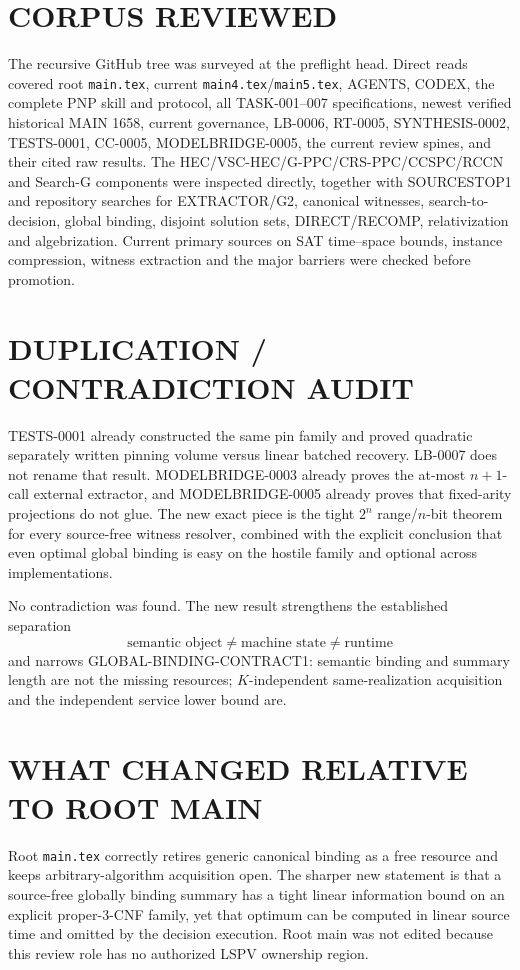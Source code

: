 \documentclass[11pt]{article}
\begin{document}
\section{CORPUS REVIEWED}
The recursive GitHub tree was surveyed at the preflight head.  Direct reads
covered root \texttt{main.tex}, current \texttt{main4.tex}/\texttt{main5.tex},
AGENTS, CODEX, the complete PNP skill and protocol, all TASK-001--007
specifications, newest verified historical MAIN 1658, current governance,
LB-0006, RT-0005, SYNTHESIS-0002, TESTS-0001, CC-0005,
MODELBRIDGE-0005, the current review spines, and their cited raw results.
The HEC/VSC-HEC/G-PPC/CRS-PPC/CCSPC/RCCN and Search-G components were
inspected directly, together with SOURCESTOP1 and repository searches for
EXTRACTOR/G2, canonical witnesses, search-to-decision, global binding,
disjoint solution sets, DIRECT/RECOMP, relativization and algebrization.
Current primary sources on SAT time--space bounds, instance compression,
witness extraction and the major barriers were checked before promotion.

\section{DUPLICATION / CONTRADICTION AUDIT}
TESTS-0001 already constructed the same pin family and proved quadratic
separately written pinning volume versus linear batched recovery.  LB-0007
does not rename that result.  MODELBRIDGE-0003 already proves the at-most
$n+1$-call external extractor, and MODELBRIDGE-0005 already proves that
fixed-arity projections do not glue.  The new exact piece is the tight
$2^n$ range/$n$-bit theorem for every source-free witness resolver, combined
with the explicit conclusion that even optimal global binding is easy on the
hostile family and optional across implementations.

No contradiction was found.  The new result strengthens the established
separation
\[
\text{semantic object}\ne\text{machine state}\ne\text{runtime}
\]
and narrows GLOBAL-BINDING-CONTRACT1: semantic binding and summary length are
not the missing resources; $K$-independent same-realization acquisition and
the independent service lower bound are.

\section{WHAT CHANGED RELATIVE TO ROOT MAIN}
Root \texttt{main.tex} correctly retires generic canonical binding as a free
resource and keeps arbitrary-algorithm acquisition open.  The sharper new
statement is that a source-free globally binding summary has a tight linear
information bound on an explicit proper-3-CNF family, yet that optimum can be
computed in linear source time and omitted by the decision execution.  Root
main was not edited because this review role has no authorized LSPV ownership
region.
\end{document}
